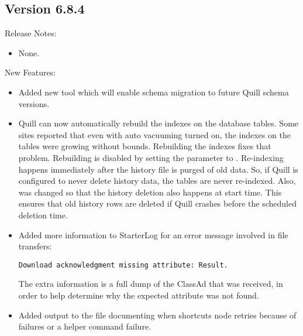 \subsection*{\label{sec:New-6-8-4}Version 6.8.4}

\noindent Release Notes:

\begin{itemize}

\item None.

\end{itemize}


\noindent New Features:

\begin{itemize}

\item Added new tool  which will
enable schema migration to future Quill schema versions.

\item Quill can now automatically rebuild the indexes on the
 database tables.  Some sites reported that even
with auto vacuuming turned on, the indexes on the tables were 
growing without bounds.  Rebuilding the indexes fixes that problem.
Rebuilding is disabled by setting the parameter 
to .  Re-indexing happens immediately after the history file
is purged of old data. So, if Quill is configured to never delete
history data, the tables are never re-indexed.  Also, 
was changed so that the history deletion also happens at start time.
This ensures that old history rows are deleted if Quill crashes
before the scheduled deletion time.

\item Added more information to StarterLog for an error message
involved in file transfers: 
\begin{verbatim}
Download acknowledgment missing attribute: Result.
\end{verbatim}
The extra information is a full dump of the
ClassAd that was received, in order to help determine why the expected
attribute was not found.

\item Added output to the  file documenting when
 shortcuts node retries because of 
failures or a helper command failure.

\end{itemize}

